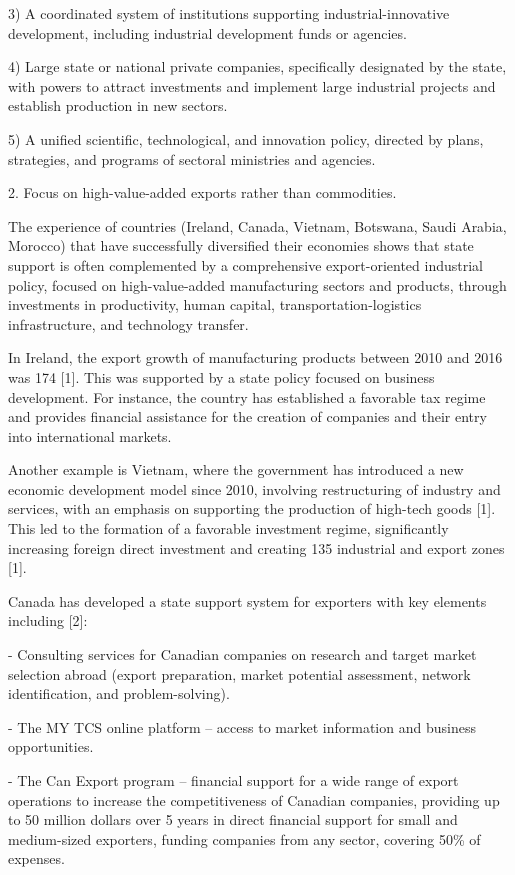 \begin{multicols}{2}
3) A coordinated system of institutions supporting industrial-innovative
development, including industrial development funds or agencies.

4) Large state or national private companies, specifically designated by
the state, with powers to attract investments and implement large
industrial projects and establish production in new sectors.

5) A unified scientific, technological, and innovation policy, directed
by plans, strategies, and programs of sectoral ministries and agencies.

2. Focus on high-value-added exports rather than commodities.

The experience of countries (Ireland, Canada, Vietnam, Botswana, Saudi
Arabia, Morocco) that have successfully diversified their economies
shows that state support is often complemented by a comprehensive
export-oriented industrial policy, focused on high-value-added
manufacturing sectors and products, through investments in productivity,
human capital, transportation-logistics infrastructure, and technology
transfer.

In Ireland, the export growth of manufacturing products between 2010 and
2016 was 174 {[}1{]}. This was supported by a state policy focused on
business development. For instance, the country has established a
favorable tax regime and provides financial assistance for the creation
of companies and their entry into international markets.

Another example is Vietnam, where the government has introduced a new
economic development model since 2010, involving restructuring of
industry and services, with an emphasis on supporting the production of
high-tech goods {[}1{]}. This led to the formation of a favorable
investment regime, significantly increasing foreign direct investment
and creating 135 industrial and export zones {[}1{]}.

Canada has developed a state support system for exporters with key
elements including {[}2{]}:

- Consulting services for Canadian companies on research and target
market selection abroad (export preparation, market potential
assessment, network identification, and problem-solving).

- The MY TCS online platform -- access to market information and
business opportunities.

- The Can Export program -- financial support for a wide range of export
operations to increase the competitiveness of Canadian companies,
providing up to 50 million dollars over 5 years in direct financial
support for small and medium-sized exporters, funding companies from any
sector, covering 50\% of expenses.


\end{multicols}
